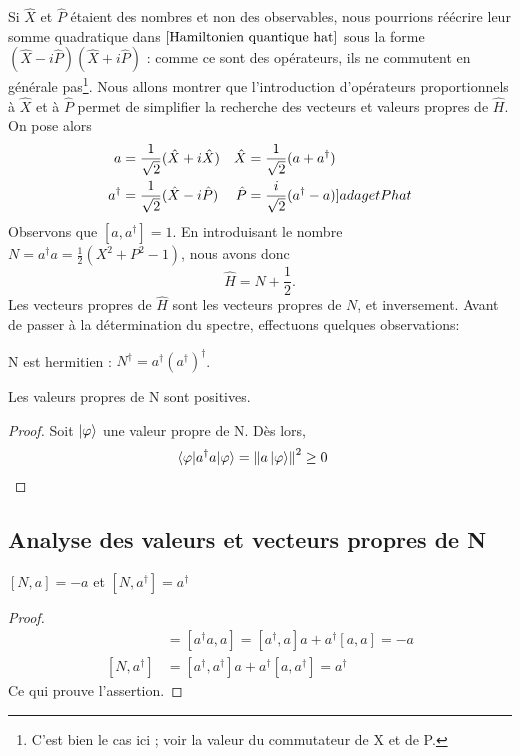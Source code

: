 \documentclass[../Notesdecours.tex]{subfiles}
\begin{document}
Si $\hat{X}$ et $\hat{P}$ étaient des nombres et non des observables, nous pourrions réécrire leur somme quadratique dans $\eqref{Hamiltonien quantique hat}$ sous la forme $(\hat{X}-i\hat{P})(\hat{X}+i\hat{P})$ : comme ce sont des opérateurs, ils ne commutent en générale pas\footnote{C'est bien le cas ici ; voir la valeur du commutateur de X et de P.}. Nous allons montrer que l'introduction d'opérateurs proportionnels à $\hat{X}$ et à $\hat{P}$ permet de simplifier la recherche des vecteurs et valeurs propres de $\hat{H}$. On pose alors
\begin{align}
    a &= \frac{1}{\sqrt{2}}(\hat{X}+i\hat{X})   & \hat{X} &= \frac{1}{\sqrt{2}}(a+a^\dagger)\label{a et X hat}\\
    a^\dagger &= \frac{1}{\sqrt{2}}(\hat{X}-i\hat{P})    & \hat{P} &= \frac{i}{\sqrt{2}}(a^\dagger-a) \label[]{a dag et P hat}
\end{align}
Observons que $[a,a^\dagger] = 1$. En introduisant le nombre $N = a^\dagger a = \frac{1}{2}\left(X^2+P^2-1\right)$, nous avons donc
\begin{equation}
    \hat{H} = N+\frac{1}{2}.
\end{equation}
Les vecteurs propres de $\hat{H}$ sont les vecteurs propres de $N$, et inversement. Avant de passer à la détermination du spectre, effectuons quelques observations:
\begin{Property}
    N est hermitien : $N^\dagger = a^\dagger \left(a^\dagger\right)^\dagger$.
\end{Property}
\begin{Property}
    \label{N positif}
    Les valeurs propres de N sont positives.
\end{Property}
\begin{proof}
    Soit $\ket{\varphi}$ une valeur propre de N. Dès lors,
    \begin{align*}
        \braket{\varphi|a^\dagger a|\varphi} &= \norm{a\ket{\varphi}}^2 \geq 0
    \end{align*}
\end{proof}

\subsection{Analyse des valeurs et vecteurs propres de N}

\begin{Property}
    $[N,a]=-a$ et $[N,a^\dagger] = a^\dagger$
\end{Property}
\begin{proof}
    \begin{align*}
        [N,a] &= [a^\dagger a,a] = [a^\dagger,a]a+a^\dagger [a,a] = -a\\
        [N,a^\dagger] &= [a^\dagger,a^\dagger]a+a^\dagger [a,a^\dagger] = a^\dagger
    \end{align*}
    Ce qui prouve l'assertion.
\end{proof}
\end{document}
